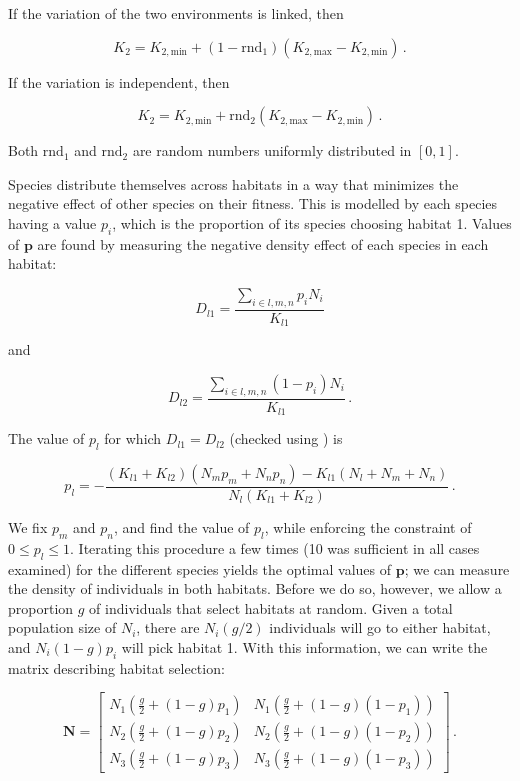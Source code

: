 \documentclass[10pt,a4paper,onecolumn]{article}
\begin{document}
If the variation of the two environments is linked, then

\[K_2 = K_{2,\text{min}} + (1-\text{rnd}_1)(K_{2,\text{max}}-K_{2,\text{min}})\,.\]

If the variation is independent, then

\[K_2 = K_{2,\text{min}} + \text{rnd}_2(K_{2,\text{max}}-K_{2,\text{min}})\,.\]

Both \(\text{rnd}_1\) and \(\text{rnd}_2\) are random numbers uniformly
distributed in \([0,1]\).

Species distribute themselves across habitats in a way that minimizes
the negative effect of other species on their fitness. This is modelled
by each species having a value \(p_i\), which is the proportion of its
species choosing habitat 1. Values of \(\mathbf{p}\) are found by
measuring the negative density effect of each species in each habitat:

\begin{equation}
D_{l1} = \frac{\sum_{i\in l,m,n}p_iN_i}{K_{l1}}
\end{equation}

and

\begin{equation}
D_{l2} = \frac{\sum_{i\in l,m,n}(1-p_i)N_i}{K_{l1}} \,.
\end{equation}

The value of \(p_l\) for which \(D_{l1}=D_{l2}\) (checked using
\textcite{maxi14mca}) is

\begin{equation}
p_l = - \frac{(K_{l1}+K_{l2})(N_mp_m+N_np_n)-K_{l1}(N_l+N_m+N_n)}{N_l(K_{l1}+K_{l2})} \,.
\end{equation}

We fix \(p_m\) and \(p_n\), and find the value of \(p_l\), while
enforcing the constraint of \(0 \leq p_l \leq 1\). Iterating this
procedure a few times (10 was sufficient in all cases examined) for the
different species yields the optimal values of \(\mathbf{p}\); we can
measure the density of individuals in both habitats. Before we do so,
however, we allow a proportion \(g\) of individuals that select habitats
at random. Given a total population size of \(N_i\), there are
\(N_i(g/2)\) individuals will go to either habitat, and \(N_i(1-g)p_i\)
will pick habitat 1. With this information, we can write the matrix
describing habitat selection:

\begin{equation}
\mathbf{N} = \begin{bmatrix}
  N_1(\frac{g}{2}+(1-g)p_1) & N_1(\frac{g}{2}+(1-g)(1-p_1))\\
  N_2(\frac{g}{2}+(1-g)p_2) & N_2(\frac{g}{2}+(1-g)(1-p_2))\\
  N_3(\frac{g}{2}+(1-g)p_3) & N_3(\frac{g}{2}+(1-g)(1-p_3))
\end{bmatrix} \,.
\end{equation}
\end{document}
